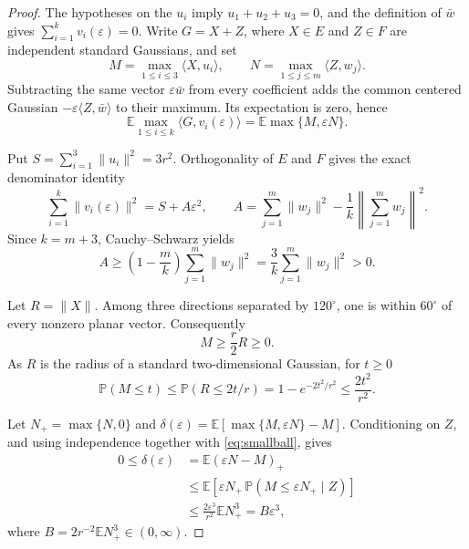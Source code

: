 \documentclass[11pt]{article}
\begin{document}
\begin{proof}
The hypotheses on the \(u_i\) imply \(u_1+u_2+u_3=0\), and the definition of
\(\bar w\) gives \(\sum_{i=1}^k v_i(\varepsilon)=0\).
Write \(G=X+Z\), where \(X\in E\) and \(Z\in F\) are independent standard
Gaussians, and set
\[
M=\max_{1\le i\le3}\langle X,u_i\rangle,
\qquad
N=\max_{1\le j\le m}\langle Z,w_j\rangle.
\]
Subtracting the same vector \(\varepsilon\bar w\) from every coefficient adds
the common centered Gaussian
\(-\varepsilon\langle Z,\bar w\rangle\) to their maximum.  Its expectation is
zero, hence
\begin{equation}\label{eq:numerator}
\mathbb E\max_{1\le i\le k}\langle G,v_i(\varepsilon)\rangle
=\mathbb E\max\{M,\varepsilon N\}.
\end{equation}

Put \(S=\sum_{i=1}^3\|u_i\|^2=3r^2\). Orthogonality of \(E\) and \(F\)
gives the exact denominator identity
\begin{equation}\label{eq:denominator}
\sum_{i=1}^k\|v_i(\varepsilon)\|^2=S+A\varepsilon^2,
\qquad
A=\sum_{j=1}^m\|w_j\|^2-\frac1k
\left\|\sum_{j=1}^m w_j\right\|^2.
\end{equation}
Since \(k=m+3\), Cauchy--Schwarz yields
\[
A\ge \left(1-\frac{m}{k}\right)\sum_{j=1}^m\|w_j\|^2
=\frac3k\sum_{j=1}^m\|w_j\|^2>0.
\]

Let \(R=\|X\|\). Among three directions separated by \(120^\circ\), one is
within \(60^\circ\) of every nonzero planar vector. Consequently
\begin{equation}\label{eq:radial}
M\ge \frac r2 R\ge0.
\end{equation}
As \(R\) is the radius of a standard two-dimensional Gaussian, for \(t\ge0\)
\begin{equation}\label{eq:smallball}
\mathbb P(M\le t)
\le \mathbb P(R\le 2t/r)
=1-e^{-2t^2/r^2}
\le \frac{2t^2}{r^2}.
\end{equation}

Let \(N_+=\max\{N,0\}\) and
\(\delta(\varepsilon)=\mathbb E[\max\{M,\varepsilon N\}-M]\).
Conditioning on \(Z\), and using independence together with
\eqref{eq:smallball}, gives
\begin{align*}
0\le\delta(\varepsilon)
&=\mathbb E(\varepsilon N-M)_+\\
&\le \mathbb E\!\left[
\varepsilon N_+\,\mathbb P(M\le\varepsilon N_+\mid Z)
\right]\\
&\le \frac{2\varepsilon^3}{r^2}\mathbb E N_+^3
=B\varepsilon^3,
\end{align*}
where \(B=2r^{-2}\mathbb E N_+^3\in(0,\infty)\).


\end{proof}
\end{document}
